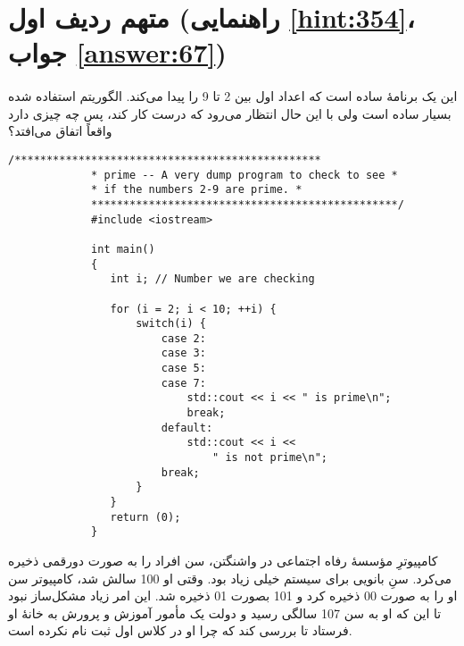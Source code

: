 \section[متهم ردیف اول]{متهم ردیف اول \protect{} (راهنمایی \ref{hint:354}، جواب \ref{answer:67})}
\paragraph{}\label{prog:19}
این یک برنامهٔ ساده است که اعداد اول بین 2 تا 9 را پیدا می‌کند. الگوریتم استفاده شده بسیار ساده است ولی با این حال انتظار می‌رود که درست کار کند، پس چه چیزی دارد واقعاً اتفاق می‌افتد؟

\begin{LTR}
        \begin{lstlisting}[style=C++Style]
             /************************************************
             * prime -- A very dump program to check to see *
             * if the numbers 2-9 are prime. *
             ************************************************/
             #include <iostream>

             int main()
             {
             	int i; // Number we are checking

             	for (i = 2; i < 10; ++i) {
             		switch(i) {
             			case 2:
             			case 3:
             			case 5:
             			case 7:
             				std::cout << i << " is prime\n";
             				break;
             			default:
             				std::cout << i <<
             					" is not prime\n";
             			break;
             		}
             	}
             	return (0);
             }
        \end{lstlisting}
\end{LTR}

\begin{tcolorbox}
    کامپیوترِ مؤسسهٔ رفاه اجتماعی در واشنگتن، سن افراد را به صورت دورقمی ذخیره می‌کرد. سنِ بانویی برای سیستم خیلی زیاد بود. وقتی او 100 سالش شد، کامپیوتر سن او را به صورت 00 ذخیره کرد و 101 بصورت 01 ذخیره شد. این امر زیاد مشکل‌ساز نبود تا این که او به سن 107 سالگی رسید و دولت یک مأمور آموزش و پرورش به خانهٔ او فرستاد تا بررسی کند که چرا او در کلاس اول ثبت نام نکرده است.
\end{tcolorbox}